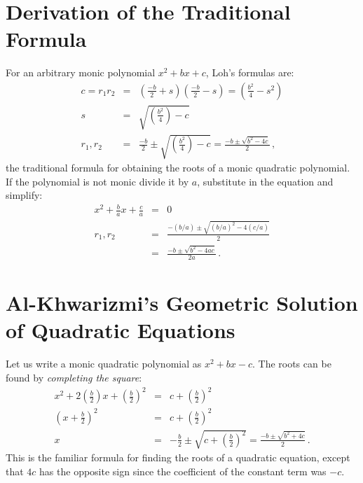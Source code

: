 \section{Derivation of the Traditional Formula}\label{s.general}
For an arbitrary monic polynomial $x^2+bx+c$, Loh's formulas are:
\begin{eqnarray*}
c=r_1r_2&=&\left(\frac{-b}{2}+s\right)  \left(\frac{-b}{2}-s\right)=\left(\frac{b^2}{4}-s^2\right)\\
s&=&\sqrt{\left(\frac{b^2}{4}\right)-c}\\
r_1,r_2&=&\frac{-b}{2}\pm\sqrt{\left(\frac{b^2}{4}\right)-c}=\frac{-b\pm\sqrt{b^2-4c}}{2}\,,
\end{eqnarray*}
the traditional formula for obtaining the roots of a monic quadratic polynomial. If the polynomial is not monic divide it by $a$, substitute in the  equation and simplify:
\begin{eqnarray*}
x^2+\frac{b}{a}x+\frac{c}{a}&=&0\\
r_1,r_2&=&\frac{-(b/a)\pm\sqrt{(b/a)^2-4(c/a)}}{2}\\
&=&\frac{-b\pm\sqrt{b^2-4ac}}{2a}\,.
\end{eqnarray*}

\section{Al-Khwarizmi's Geometric Solution of Quadratic Equations}\label{s.khwar}

Let us write a monic quadratic polynomial as $x^2+bx-c$. The roots can be found by \emph{completing the square}:
\begin{eqnarray*}
x^2+2\left(\frac{b}{2}\right)x+\left(\frac{b}{2}\right)^2&=&c+\left(\frac{b}{2}\right)^2\\
\left(x+\frac{b}{2}\right)^2&=&c+\left(\frac{b}{2}\right)^2\\
x&=&-\frac{b}{2}\pm\sqrt{c+\left(\frac{b}{2}\right)^2}=
\frac{-b\pm\sqrt{b^2+4c}}{2}\,.
\end{eqnarray*}
This is the familiar formula for finding the roots of a quadratic equation, except that $4c$ has the opposite sign since the  coefficient of the constant term was $-c$.

